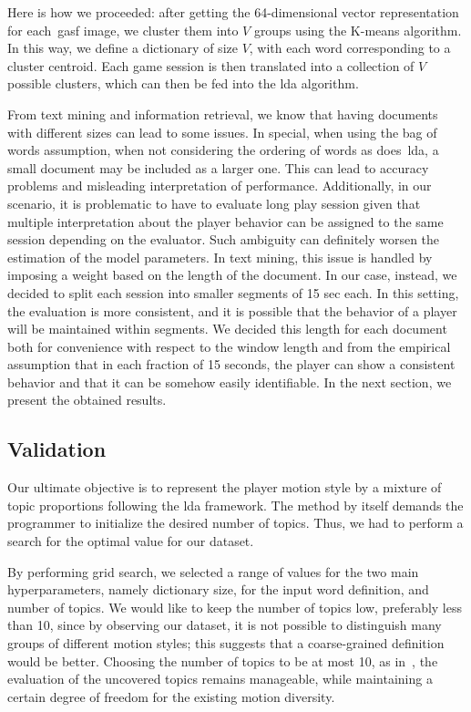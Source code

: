 Here is how we proceeded: after getting the 64-dimensional vector representation for each~\gls{gasf} image, we cluster them into $V$ groups using the K-means algorithm. In this way, we define a dictionary of size $V$, with each word corresponding to a cluster centroid. Each game session is then translated into a collection of $V$ possible clusters, which can then be fed into the \gls{lda} algorithm.

From text mining and information retrieval, we know that having documents with different sizes can lead to some issues. In special, when using the bag of words assumption, \ie when not considering the ordering of words as does~\gls{lda}, a small document may be included as a larger one. This can lead to accuracy problems and misleading interpretation of performance. Additionally, in our scenario, it is problematic to have to evaluate long play session given that multiple interpretation about the player behavior can be assigned to the same session depending on the evaluator. Such ambiguity can definitely worsen the estimation of the model parameters.
In text mining, this issue is handled by imposing a weight based on the length of the document. In our case, instead, we decided to split each session into smaller segments of 15 sec each. In this setting, the evaluation is more consistent, and it is possible that the behavior of a player will be maintained within segments. We decided this length for each document both for convenience with respect to the window length and from the empirical assumption that in each fraction of 15 seconds, the player can show a consistent behavior and that it can be somehow easily identifiable. In the next section, we present the obtained results.

\subsection{Validation}

Our ultimate objective is to represent the player motion style by a mixture of topic proportions following the \gls{lda} framework. The method by itself demands the programmer to initialize the desired number of topics. Thus, we had to perform a search for the optimal value for our dataset.

By performing grid search, we selected a range of values for the two main hyperparameters, namely dictionary size, for the input word definition, and number of topics. We would like to keep the number of topics low, preferably less than 10, since by observing our dataset, it is not possible to distinguish many groups of different motion styles; this suggests that a coarse-grained definition would be better. Choosing the number of topics to be at most 10, as in~\cite{smith_mining_2016}, the evaluation of the uncovered topics remains manageable, while maintaining a certain degree of freedom for the existing motion diversity.

